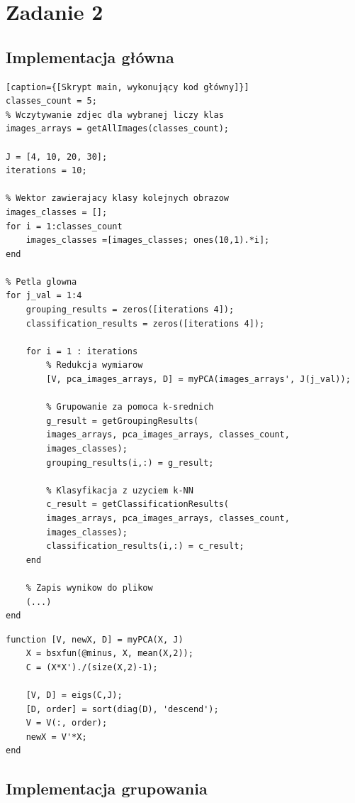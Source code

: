 \section{Zadanie 2}

\subsection{Implementacja główna}

\begin{lstlisting}[linewidth=16.0cm][caption={[Skrypt main, wykonujący kod główny]}]
classes_count = 5;
% Wczytywanie zdjec dla wybranej liczy klas
images_arrays = getAllImages(classes_count);
	
J = [4, 10, 20, 30];
iterations = 10;
	
% Wektor zawierajacy klasy kolejnych obrazow
images_classes = [];
for i = 1:classes_count
	images_classes =[images_classes; ones(10,1).*i];
end
	
% Petla glowna
for j_val = 1:4
	grouping_results = zeros([iterations 4]);
	classification_results = zeros([iterations 4]);
	
	for i = 1 : iterations
		% Redukcja wymiarow
		[V, pca_images_arrays, D] = myPCA(images_arrays', J(j_val));
		
		% Grupowanie za pomoca k-srednich
		g_result = getGroupingResults(
		images_arrays, pca_images_arrays, classes_count, 
		images_classes);
		grouping_results(i,:) = g_result;
		
		% Klasyfikacja z uzyciem k-NN
		c_result = getClassificationResults(
		images_arrays, pca_images_arrays, classes_count, 
		images_classes);
		classification_results(i,:) = c_result;
	end
	
	% Zapis wynikow do plikow
	(...)
end
\end{lstlisting}

\begin{lstlisting}[linewidth=16.0cm]
function [V, newX, D] = myPCA(X, J)
	X = bsxfun(@minus, X, mean(X,2));
	C = (X*X')./(size(X,2)-1);
	
	[V, D] = eigs(C,J);
	[D, order] = sort(diag(D), 'descend');
	V = V(:, order);
	newX = V'*X;
end
\end{lstlisting}


\subsection{Implementacja grupowania}

